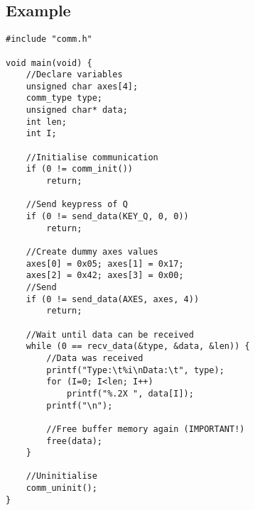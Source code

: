 \documentclass[10pt]{article}
\begin{document}
\subsection*{Example}

\begin{lstlisting}
#include "comm.h"

void main(void) {
	//Declare variables
	unsigned char axes[4];
	comm_type type;
	unsigned char* data;
	int len;
	int I;

	//Initialise communication
	if (0 != comm_init())
		return;

	//Send keypress of Q
	if (0 != send_data(KEY_Q, 0, 0))
		return;

	//Create dummy axes values
	axes[0] = 0x05;	axes[1] = 0x17;
	axes[2] = 0x42;	axes[3] = 0x00;
	//Send
	if (0 != send_data(AXES, axes, 4))
		return;

	//Wait until data can be received
	while (0 == recv_data(&type, &data, &len)) {
		//Data was received
		printf("Type:\t%i\nData:\t", type);
		for (I=0; I<len; I++)
			printf("%.2X ", data[I]);
		printf("\n");

		//Free buffer memory again (IMPORTANT!)
		free(data);
	}

	//Uninitialise
	comm_uninit();
}
\end{lstlisting}
\end{document}
